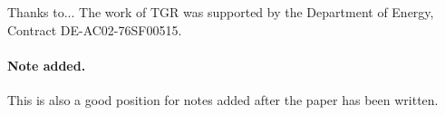 \documentclass[a4paper,11pt]{article}
\begin{document}
\acknowledgments

Thanks to...
The work of TGR was supported by the Department of Energy, Contract DE-AC02-76SF00515.
\paragraph{Note added.} This is also a good position for notes added
after the paper has been written.










\end{document}
